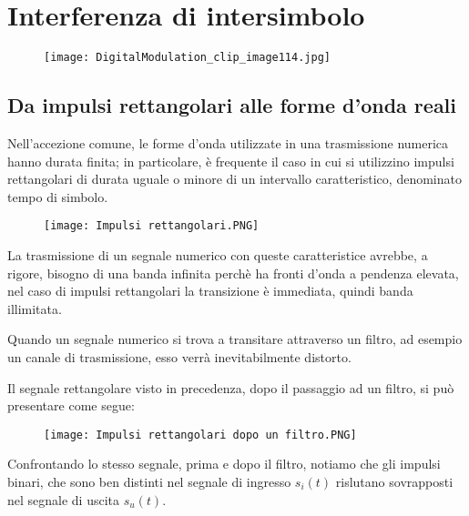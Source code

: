\chapter{Interferenza di intersimbolo} 

\begin{figure}[h]
    \centering
    \texttt{[image: DigitalModulation\_clip\_image114.jpg]}
\end{figure}  

\newpage 

\section{Da impulsi rettangolari alle forme d'onda reali}

Nell'accezione comune, le forme d'onda utilizzate in una trasmissione numerica hanno durata finita; 
in particolare, è frequente il caso in cui si utilizzino impulsi rettangolari di durata uguale o minore di un intervallo caratteristico, denominato tempo di simbolo. \newline 

\begin{figure}[h]
    \centering
    \texttt{[image: Impulsi rettangolari.PNG]}
\end{figure}  

La trasmissione di un segnale numerico con queste caratteristice avrebbe, a rigore, bisogno di una banda infinita perchè ha fronti 
d'onda a pendenza elevata, nel caso di impulsi rettangolari la transizione è immediata, quindi banda illimitata. \newline 

Quando un segnale numerico si trova a transitare attraverso un filtro, ad esempio un canale di trasmissione, esso verrà inevitabilmente distorto. \newline 

Il segnale rettangolare visto in precedenza, dopo il passaggio ad un filtro, si può presentare come segue: 

\begin{figure}[h]
    \centering
    \texttt{[image: Impulsi rettangolari dopo un filtro.PNG]}
\end{figure} 

Confrontando lo stesso segnale, prima e dopo il filtro, notiamo che gli impulsi binari, che sono ben distinti nel segnale di ingresso $s_i (t)$ rislutano sovrapposti nel segnale di uscita $s_u (t)$. \newline 

